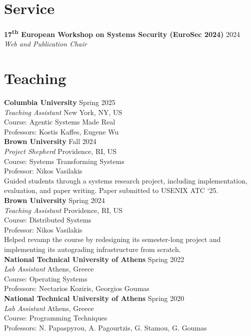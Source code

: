 \documentclass[margin, 12pt]{resume}
\newcommand{\sectionVSpace}{\vspace{-3.5ex}} %
\newcommand{\institution}[1]{\textbf{#1}\xspace}
\newcommand{\ordinal}[1]{\textsuperscript{#1}\xspace}
\newcommand{\rSection}[1]{\sectionVSpace\section{#1}\xspace}
\newcommand{\role}[1]{\textit{#1}\xspace}
\newcommand{\service}[1]{\textbf{#1}\xspace}
\newcommand{\stitle}[1]{#1:\xspace}
\begin{document}
\begin{resume}
    \rSection{Service}

    \service{17\ordinal{th} European Workshop on Systems Security (EuroSec 2024)} \hfill 2024 \\
    \role{Web and Publication Chair} \\

    \rSection{Teaching}

    \institution{Columbia University} \hfill Spring 2025 \\
    \role{Teaching Assistant} \hfill New York, NY, US \\
    \stitle{Course} Agentic Systems Made Real \\
    \stitle{Professors} Kostis Kaffes, Eugene Wu \\

    \institution{Brown University} \hfill Fall 2024 \\
    \role{Project Shepherd} \hfill Providence, RI, US \\
    \stitle{Course} Systems Transforming Systems \\
    \stitle{Professor} Nikos Vasilakis \\
    Guided students through a systems research project, including implementation, evaluation, and paper writing. Paper submitted to USENIX ATC `25. \\

    \institution{Brown University} \hfill Spring 2024 \\
    \role{Teaching Assistant} \hfill Providence, RI, US \\
    \stitle{Course} Distributed Systems \\
    \stitle{Professor} Nikos Vasilakis \\
    Helped revamp the course by redesigning its semester-long project and implementing its autograding infrastructure from scratch. \\

    \institution{National Technical University of Athens} \hfill Spring 2022 \\
    \role{Lab Assistant} \hfill Athens, Greece \\
    \stitle{Course} Operating Systems \\
    \stitle{Professors} Nectarios Koziris, Georgios Goumas \\

    \institution{National Technical University of Athens} \hfill Spring 2020 \\
    \role{Lab Assistant} \hfill Athens, Greece \\
    \stitle{Course} Programming Techniques \\
    \stitle{Professors} N. Papaspyrou, A. Pagourtzis, G. Stamou, G. Goumas \\


\end{resume}
\end{document}
